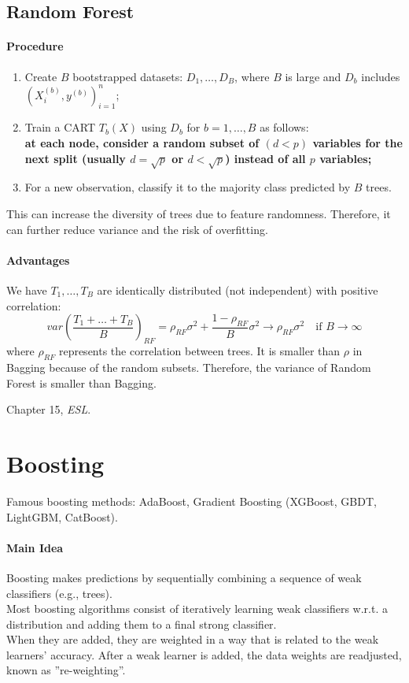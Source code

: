 \documentclass[12pt]{book}
\theoremstyle{definition}
\theoremstyle{remark}
\begin{document}
\subsection{Random Forest}
\paragraph{Procedure}
\begin{enumerate}
    \item Create $B$ bootstrapped datasets: $D_1,\dots,D_B$, where $B$ is large and $D_b$ includes $(X_i^{(b)},y^{(b)})_{i=1}^n$;
    \item Train a CART $T_b(X)$ using $D_b$ for $b = 1,\dots, B$ as follows:\\
    \textbf{at each node, consider a random subset of $(d<p)$ variables for the next split (usually $d = \sqrt{p}$ or $d<\sqrt{p}$) instead of all $p$ variables;}
    \item For a new observation, classify it to the majority class predicted by $B$ trees.
\end{enumerate}

This can increase the diversity of trees due to feature randomness. Therefore, it can further reduce variance and the risk of overfitting. 

\paragraph{Advantages}
We have $T_1,\dots,T_B$ are identically distributed (not independent) with positive correlation:
    \[var (\frac{T_1+\dots+T_B}{B})_{RF} = \rho_{RF}\sigma^2+\frac{1-\rho_{RF}}{B}\sigma^2 \rightarrow \rho_{RF}\sigma^2\quad \text{if }B \rightarrow \infty\]
    where $\rho_{RF}$ represents the correlation between trees. It is smaller than $\rho$ in Bagging because of the random subsets. Therefore, the variance of Random Forest is smaller than Bagging.

\begin{referencebox}
    Chapter 15, \textit{ESL}.
\end{referencebox}






\newpage
\section{Boosting}
Famous boosting methods: AdaBoost, Gradient Boosting (XGBoost, GBDT, LightGBM, CatBoost).
\paragraph{Main Idea} 
Boosting makes predictions by sequentially combining a sequence of weak classifiers (e.g., trees). \\Most boosting algorithms consist of iteratively learning weak classifiers w.r.t. a distribution and adding them to a final strong classifier. \\
When they are added, they are weighted in a way that is related to the weak learners’ accuracy. After a weak learner is added, the data weights are readjusted, known as ”re-weighting”. \\
\end{document}
